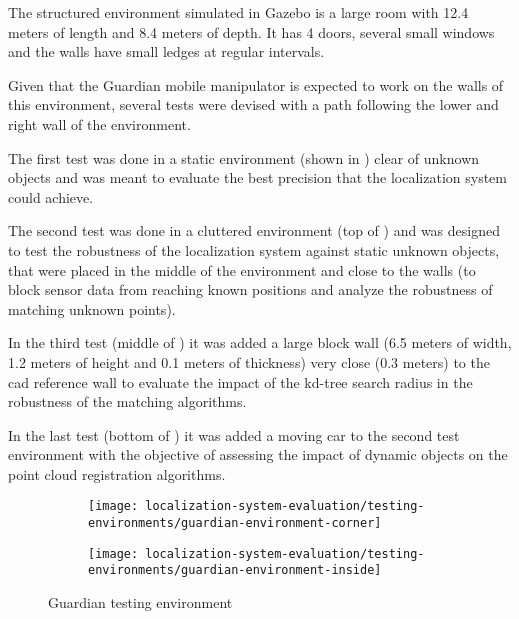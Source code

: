 The structured environment simulated in Gazebo is a large room with 12.4 meters of length and 8.4 meters of depth. It has 4 doors, several small windows and the walls have small ledges at regular intervals.

Given that the Guardian mobile manipulator is expected to work on the walls of this environment, several tests were devised with a path following the lower and right wall of the environment.

The first test was done in a static environment (shown in ) clear of unknown objects and was meant to evaluate the best precision that the localization system could achieve.

The second test was done in a cluttered environment (top of ) and was designed to test the robustness of the localization system against static unknown objects, that were placed in the middle of the environment and close to the walls (to block sensor data from reaching known positions and analyze the robustness of matching unknown points).

In the third test (middle of ) it was added a large block wall (6.5 meters of width, 1.2 meters of height and 0.1 meters of thickness) very close (0.3 meters) to the \gls{cad} reference wall to evaluate the impact of the kd-tree search radius in the robustness of the matching algorithms.

In the last test (bottom of ) it was added a moving car to the second test environment with the objective of assessing the impact of dynamic objects on the point cloud registration algorithms.


\begin{figure}[H]
	\centering
	\begin{subfigure}[ht]{0.33\textwidth}
		\centering
		\texttt{[image: localization-system-evaluation/testing-environments/guardian-environment-corner]}
	\end{subfigure}
	\begin{subfigure}[ht]{0.33\textwidth}
		\centering
		\texttt{[image: localization-system-evaluation/testing-environments/guardian-environment-inside]}
	\end{subfigure}
	\caption{Guardian testing environment}
	\label{fig:localization-system-evaluation_guardian-tests-environment}
\end{figure}

